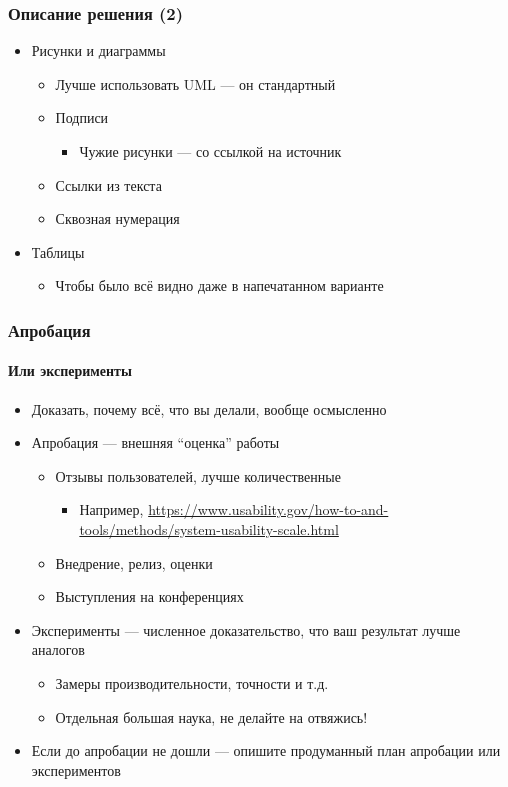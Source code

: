 \documentclass{../../slides-style}
\begin{document}
    \begin{frame}
        \frametitle{Описание решения (2)}
        \begin{itemize}
            \item Рисунки и диаграммы
            \begin{itemize}
                \item Лучше использовать UML --- он стандартный
                \item Подписи
                \begin{itemize}
                    \item Чужие рисунки --- со ссылкой на источник
                \end{itemize}
                \item Ссылки из текста
                \item Сквозная нумерация
            \end{itemize}
            \item Таблицы
            \begin{itemize}
                \item Чтобы было всё видно даже в напечатанном варианте
            \end{itemize}
        \end{itemize}
    \end{frame}

    \begin{frame}
        \frametitle{Апробация}
        \framesubtitle{Или эксперименты}
        \begin{itemize}
            \item Доказать, почему всё, что вы делали, вообще осмысленно
            \item Апробация --- внешняя \enquote{оценка} работы
            \begin{itemize}
                \item Отзывы пользователей, лучше количественные
                \begin{itemize}
                    \item Например, \url{https://www.usability.gov/how-to-and-tools/methods/system-usability-scale.html}
                \end{itemize}
                \item Внедрение, релиз, оценки
                \item Выступления на конференциях
            \end{itemize}
            \item Эксперименты --- численное доказательство, что ваш результат лучше аналогов
            \begin{itemize}
                \item Замеры производительности, точности и т.д.
                \item Отдельная большая наука, не делайте на отвяжись!
            \end{itemize}
            \item Если до апробации не дошли --- опишите продуманный план апробации или экспериментов
        \end{itemize}
    \end{frame}
\end{document}
